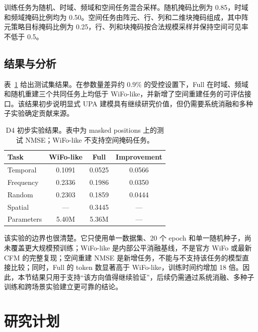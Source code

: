 \documentclass[journal]{IEEEtran}
\begin{document}
训练任务为随机、时域、频域和空间任务混合采样。随机掩码比例为 0.85，时域和频域掩码比例均为 0.50。空间任务由阵元、行、列和二维块掩码组成，其中阵元策略目标掩码比例为 0.25，行、列和块掩码按合法规模采样并保持空间可见率不低于 0.5。

\subsection{结果与分析}

表~\ref{tab:preliminary} 给出测试集结果。在参数量差异约 0.9\% 的受控设置下，Full 在时域、频域和随机重建三个共同任务上均低于 WiFo-like，并新增了空间重建任务的可评估接口。该结果初步说明显式 UPA 建模具有继续研究价值，但仍需要系统消融和多种子实验确定贡献来源。

\begin{table}[!htbp]
\caption{D4 初步实验结果。表中为 masked positions 上的测试 NMSE；WiFo-like 不支持空间掩码任务。}
\label{tab:preliminary}
\centering
\begin{tabular}{lccc}
\toprule
Task & WiFo-like & Full & Improvement \\
\midrule
Temporal & 0.1091 & 0.0525 & 0.0566 \\
Frequency & 0.2336 & 0.1986 & 0.0350 \\
Random & 0.2303 & 0.1859 & 0.0444 \\
Spatial & --- & 0.3445 & --- \\
\midrule
Parameters & 5.40M & 5.36M & --- \\
\bottomrule
\end{tabular}
\end{table}

该实验的边界也很清楚。它只使用单一数据集、20 个 epoch 和单一随机种子，尚未覆盖更大规模预训练；WiFo-like 是内部公平消融基线，不是官方 WiFo 或最新 CFM 的完整复现；空间重建 NMSE 是新增任务，不能与不支持该任务的模型直接比较；同时，Full 的 token 数显著高于 WiFo-like，训练时间约增加 18 倍。因此，本节结果只用于支持“该方向值得继续验证”，后续仍需通过系统消融、多种子训练和跨场景实验建立更可靠的结论。

\section{研究计划}
\end{document}
